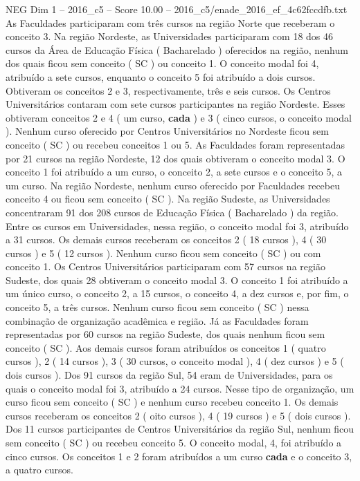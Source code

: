 \begin{textsample}{NEG Dim 1 – 2016\_c5 – Score 10.00 – 2016\_c5/enade\_2016\_ef\_4c62fccdfb.txt}
As Faculdades participaram com três cursos na região Norte que receberam o conceito 3.
Na região Nordeste, as Universidades participaram com 18 dos 46 cursos da Área de Educação Física ( Bacharelado ) oferecidos na região, nenhum dos quais ficou sem conceito ( SC ) ou conceito 1.
O conceito modal foi 4, atribuído a sete cursos, enquanto o conceito 5 foi atribuído a dois cursos.
Obtiveram os conceitos 2 e 3, respectivamente, três e seis cursos.
Os Centros Universitários contaram com sete cursos participantes na região Nordeste.
Esses obtiveram conceitos 2 e 4 ( um curso, \textbf{cada} ) e 3 ( cinco cursos, o conceito modal ).
Nenhum curso oferecido por Centros Universitários no Nordeste ficou sem conceito ( SC ) ou recebeu conceitos 1 ou 5.
As Faculdades foram representadas por 21 cursos na região Nordeste, 12 dos quais obtiveram o conceito modal 3.
O conceito 1 foi atribuído a um curso, o conceito 2, a sete cursos e o conceito 5, a um curso.
Na região Nordeste, nenhum curso oferecido por Faculdades recebeu conceito 4 ou ficou sem conceito ( SC ).
Na região Sudeste, as Universidades concentraram 91 dos 208 cursos de Educação Física ( Bacharelado ) da região.
Entre os cursos em Universidades, nessa região, o conceito modal foi 3, atribuído a 31 cursos.
Os demais cursos receberam os conceitos 2 ( 18 cursos ), 4 ( 30 cursos ) e 5 ( 12 cursos ).
Nenhum curso ficou sem conceito ( SC ) ou com conceito 1.
Os Centros Universitários participaram com 57 cursos na região Sudeste, dos quais 28 obtiveram o conceito modal 3.
O conceito 1 foi atribuído a um único curso, o conceito 2, a 15 cursos, o conceito 4, a dez cursos e, por fim, o conceito 5, a três cursos.
Nenhum curso ficou sem conceito ( SC ) nessa combinação de organização acadêmica e região.
Já as Faculdades foram representadas por 60 cursos na região Sudeste, dos quais nenhum ficou sem conceito ( SC ).
Aos demais cursos foram atribuídos os conceitos 1 ( quatro cursos ), 2 ( 14 cursos ), 3 ( 30 cursos, o conceito modal ), 4 ( dez cursos ) e 5 ( dois cursos ).
Dos 91 cursos da região Sul, 54 eram de Universidades, para os quais o conceito modal foi 3, atribuído a 24 cursos.
Nesse tipo de organização, um curso ficou sem conceito ( SC ) e nenhum curso recebeu conceito 1.
Os demais cursos receberam os conceitos 2 ( oito cursos ), 4 ( 19 cursos ) e 5 ( dois cursos ).
Dos 11 cursos participantes de Centros Universitários da região Sul, nenhum ficou sem conceito ( SC ) ou recebeu conceito 5.
O conceito modal, 4, foi atribuído a cinco cursos.
Os conceitos 1 e 2 foram atribuídos a um curso \textbf{cada} e o conceito 3, a quatro cursos.

\end{textsample}
